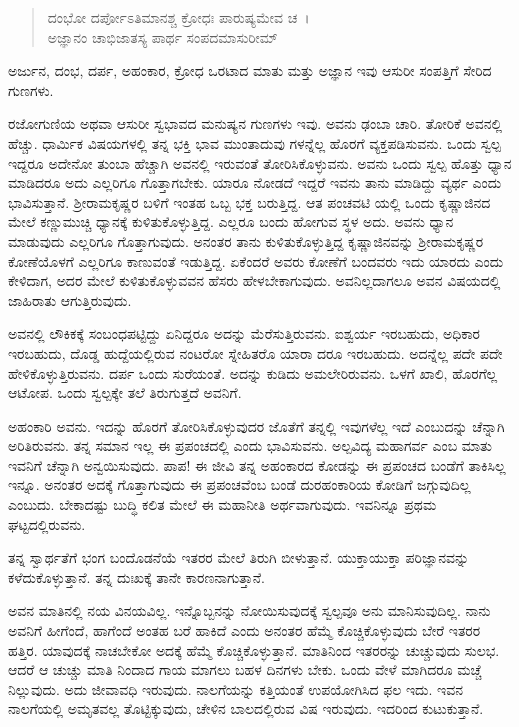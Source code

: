 \begin{verse}
ದಂಭೋ ದರ್ಪೋಽತಿಮಾನಶ್ಚ ಕ್ರೋಧಃ ಪಾರುಷ್ಯಮೇವ ಚ~।\\ಅಜ್ಞಾನಂ ಚಾಭಿಜಾತಸ್ಯ ಪಾರ್ಥ ಸಂಪದಮಾಸುರೀಮ್ 
\end{verse}

{\small ಅರ್ಜುನ, ದಂಭ, ದರ್ಪ, ಅಹಂಕಾರ, ಕ್ರೋಧ ಒರಟಾದ ಮಾತು ಮತ್ತು ಅಜ್ಞಾನ ಇವು ಆಸುರೀ ಸಂಪತ್ತಿಗೆ ಸೇರಿದ ಗುಣಗಳು.}

ರಜೋಗುಣಿಯ ಅಥವಾ ಆಸುರೀ ಸ್ವಭಾವದ ಮನುಷ್ಯನ ಗುಣಗಳು ಇವು. ಅವನು ಢಂಬಾ ಚಾರಿ. ತೋರಿಕೆ ಅವನಲ್ಲಿ ಹೆಚ್ಚು. ಧಾರ್ಮಿಕ ವಿಷಯಗಳಲ್ಲಿ ತನ್ನ ಭಕ್ತಿ ಭಾವ ಮುಂತಾದುವು ಗಳನ್ನೆಲ್ಲ ಹೊರಗೆ ವ್ಯಕ್ತಪಡಿಸುವನು. ಒಂದು ಸ್ವಲ್ಪ ಇದ್ದರೂ ಅದೇನೋ ತುಂಬಾ ಹೆಚ್ಚಾಗಿ ಅವನಲ್ಲಿ ಇರುವಂತೆ ತೋರಿಸಿಕೊಳ್ಳುವನು. ಅವನು ಒಂದು ಸ್ವಲ್ಪ ಹೊತ್ತು ಧ್ಯಾನ ಮಾಡಿದರೂ ಅದು ಎಲ್ಲರಿಗೂ ಗೊತ್ತಾಗಬೇಕು. ಯಾರೂ ನೋಡದೆ ಇದ್ದರೆ ಇವನು ತಾನು ಮಾಡಿದ್ದು ವ್ಯರ್ಥ ಎಂದು ಭಾವಿಸುತ್ತಾನೆ. ಶ‍್ರೀರಾಮಕೃಷ್ಣರ ಬಳಿಗೆ ಇಂತಹ ಒಬ್ಬ ಭಕ್ತ ಬರುತ್ತಿದ್ದ. ಆತ ಪಂಚವಟಿ ಯಲ್ಲಿ ಒಂದು ಕೃಷ್ಣಾಜಿನದ ಮೇಲೆ ಕಣ್ಣುಮುಚ್ಚಿ ಧ್ಯಾನಕ್ಕೆ ಕುಳಿತುಕೊಳ್ಳುತ್ತಿದ್ದ. ಎಲ್ಲರೂ ಬಂದು ಹೋಗುವ ಸ್ಥಳ ಅದು. ಅವನು ಧ್ಯಾನ ಮಾಡುವುದು ಎಲ್ಲರಿಗೂ ಗೊತ್ತಾಗುವುದು. ಅನಂತರ ತಾನು ಕುಳಿತುಕೊಳ್ಳುತ್ತಿದ್ದ ಕೃಷ್ಣಾಜಿನವನ್ನು ಶ‍್ರೀರಾಮಕೃಷ್ಣರ ಕೋಣೆಯೊಳಗೆ ಎಲ್ಲರಿಗೂ ಕಾಣುವಂತೆ ಇಡುತ್ತಿದ್ದ. ಏಕೆಂದರೆ ಅವರು ಕೋಣೆಗೆ ಬಂದವರು ಇದು ಯಾರದು ಎಂದು ಕೇಳಿದಾಗ, ಅದರ ಮೇಲೆ ಕುಳಿತುಕೊಳ್ಳುವವನ ಹೆಸರು ಹೇಳಬೇಕಾಗುವುದು. ಅವನಿಲ್ಲದಾಗಲೂ ಅವನ ವಿಷಯದಲ್ಲಿ ಜಾಹಿರಾತು ಆಗುತ್ತಿರುವುದು.

ಅವನಲ್ಲಿ ಲೌಕಿಕಕ್ಕೆ ಸಂಬಂಧಪಟ್ಟಿದ್ದು ಏನಿದ್ದರೂ ಅದನ್ನು ಮೆರೆಸುತ್ತಿರುವನು. ಐಶ್ವರ್ಯ ಇರಬಹುದು, ಅಧಿಕಾರ ಇರಬಹುದು, ದೊಡ್ಡ ಹುದ್ದೆಯಲ್ಲಿರುವ ನಂಟರೋ ಸ್ನೇಹಿತರೊ ಯಾರಾ ದರೂ ಇರಬಹುದು. ಅದನ್ನೆಲ್ಲ ಪದೇ ಪದೇ ಹೇಳಿಕೊಳ್ಳುತ್ತಿರುವನು. ದರ್ಪ ಒಂದು ಸುರೆಯಂತೆ. ಅದನ್ನು ಕುಡಿದು ಅಮಲೇರಿರುವನು. ಒಳಗೆ ಖಾಲಿ, ಹೊರಗೆಲ್ಲ ಆಟೋಪ. ಒಂದು ಸ್ವಲ್ಪಕ್ಕೇ ತಲೆ ತಿರುಗುತ್ತದೆ ಅವನಿಗೆ.

ಅಹಂಕಾರಿ ಅವನು. ಇದನ್ನು ಹೊರಗೆ ತೋರಿಸಿಕೊಳ್ಳುವುದರ ಜೊತೆಗೆ ತನ್ನಲ್ಲಿ ಇವುಗಳೆಲ್ಲ ಇದೆ ಎಂಬುದನ್ನು ಚೆನ್ನಾಗಿ ಅರಿತಿರುವನು. ತನ್ನ ಸಮಾನ ಇಲ್ಲ ಈ ಪ್ರಪಂಚದಲ್ಲಿ ಎಂದು ಭಾವಿಸುವನು. ಅಲ್ಪವಿದ್ಯ ಮಹಾಗರ್ವ ಎಂಬ ಮಾತು ಇವನಿಗೆ ಚೆನ್ನಾಗಿ ಅನ್ವಯಿಸುವುದು. ಪಾಪ! ಈ ಜೀವಿ ತನ್ನ ಅಹಂಕಾರದ ಕೋಡನ್ನು ಈ ಪ್ರಪಂಚದ ಬಂಡೆಗೆ ತಾಕಿಸಿಲ್ಲ ಇನ್ನೂ. ಅನಂತರ ಅದಕ್ಕೆ ಗೊತ್ತಾಗುವುದು ಈ ಪ್ರಪಂಚವೆಂಬ ಬಂಡೆ ದುರಹಂಕಾರಿಯ ಕೋಡಿಗೆ ಜಗ್ಗುವುದಿಲ್ಲ ಎಂಬುದು. ಬೇಕಾದಷ್ಟು ಬುದ್ಧಿ ಕಲಿತ ಮೇಲೆ ಈ ಮಹಾನೀತಿ ಅರ್ಥವಾಗುವುದು. ಇವನಿನ್ನೂ ಪ್ರಥಮ ಘಟ್ಟದಲ್ಲಿರುವನು.

ತನ್ನ ಸ್ವಾರ್ಥತೆಗೆ ಭಂಗ ಬಂದೊಡನೆಯೆ ಇತರರ ಮೇಲೆ ತಿರುಗಿ ಬೀಳುತ್ತಾನೆ. ಯುಕ್ತಾಯುಕ್ತಾ ಪರಿಜ್ಞಾನವನ್ನು ಕಳೆದುಕೊಳ್ಳುತ್ತಾನೆ. ತನ್ನ ದುಃಖಕ್ಕೆ ತಾನೇ ಕಾರಣನಾಗುತ್ತಾನೆ.

ಅವನ ಮಾತಿನಲ್ಲಿ ನಯ ವಿನಯವಿಲ್ಲ. ಇನ್ನೊಬ್ಬನನ್ನು ನೋಯಿಸುವುದಕ್ಕೆ ಸ್ವಲ್ಪವೂ ಅನು ಮಾನಿಸುವುದಿಲ್ಲ. ನಾನು ಅವನಿಗೆ ಹೀಗೆಂದೆ, ಹಾಗೆಂದೆ ಅಂತಹ ಬರೆ ಹಾಕಿದೆ ಎಂದು ಅನಂತರ ಹೆಮ್ಮೆ ಕೊಚ್ಚಿಕೊಳ್ಳುವುದು ಬೇರೆ ಇತರರ ಹತ್ತಿರ. ಯಾವುದಕ್ಕೆ ನಾಚಬೇಕೋ ಅದಕ್ಕೆ ಹೆಮ್ಮೆ ಕೊಚ್ಚಿಕೊಳ್ಳುತ್ತಾನೆ. ಮಾತಿನಿಂದ ಇತರರನ್ನು ಚುಚ್ಚುವುದು ಸುಲಭ. ಆದರೆ ಆ ಚುಚ್ಚು ಮಾತಿ ನಿಂದಾದ ಗಾಯ ಮಾಗಲು ಬಹಳ ದಿನಗಳು ಬೇಕು. ಒಂದು ವೇಳೆ ಮಾಗಿದರೂ ಮಚ್ಚೆ ನಿಲ್ಲುವುದು. ಅದು ಜೀವಾವಧಿ ಇರುವುದು. ನಾಲಗೆಯನ್ನು ಕತ್ತಿಯಂತೆ ಉಪಯೋಗಿಸಿದ ಫಲ ಇದು. ಇವನ ನಾಲಗೆಯಲ್ಲಿ ಅಮೃತವಲ್ಲ ತೊಟ್ಟಿಕ್ಕುವುದು, ಚೇಳಿನ ಬಾಲದಲ್ಲಿರುವ ವಿಷ ಇರುವುದು. ಇದರಿಂದ ಕುಟುಕುತ್ತಾನೆ.

